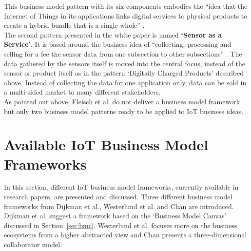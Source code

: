 	This business model pattern with its six components embodies the ``idea that the Internet of Things in its applications links digital services to physical products to create a hybrid bundle that is a single whole'' \cite{fleisch}.\\
	The second pattern presented in the white paper is named \textbf{`Sensor as a Service'}. It is based around the business idea of ``collecting, processing and selling for a fee the sensor data from one subsection to other subsections'' \cite{fleisch}. The data gathered by the sensors itself is moved into the central focus, instead of the sensor or product itself as in the pattern `Digitally Charged Products' described above. Instead of collecting the data for one application only, data can be sold in a multi-sided market to many different stakeholders.\\
	As pointed out above, Fleisch et al. do not deliver a business model framework but only two business model patterns ready to be applied to IoT business ideas.
	\vspace{-1em}
\section{Available IoT Business Model Frameworks}
\label{sec:bmf_available}
\vspace{-1em}
	In this section, different IoT business model frameworks, currently available in research papers, are presented and discussed. Three different business model frameworks from Dijkman et al., Westerlund et al. and Chan are introduced. Dijkman et al. suggest a framework based on the `Business Model Canvas' discussed in Section~\ref{sec:bmc}. Westerlund et al. focuses more on the business ecosystems from a higher abstracted view and Chan presents a three-dimensional collaborator model.
	\vspace{-1em}
